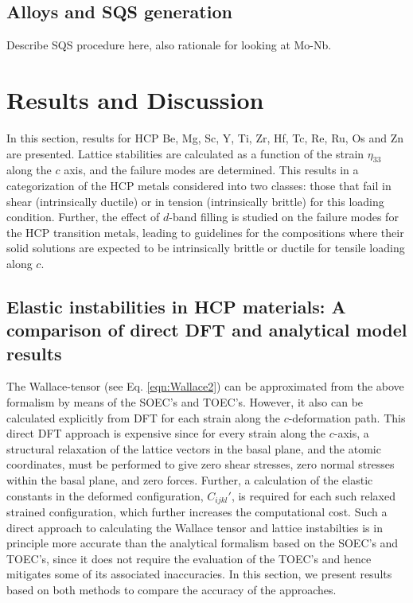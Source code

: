 \documentclass[showpacs,aps,floatfix,prb,reprint,superscriptaddress]{revtex4-1}
\begin{document}
\subsection{Alloys and SQS generation}
Describe SQS procedure here, also rationale for looking at Mo-Nb.

\section{Results and Discussion}
In this section, results for HCP Be, Mg, Sc, Y, Ti, Zr, Hf, Tc, Re, Ru, Os and Zn are presented. Lattice stabilities are calculated as a function of the strain $\eta_{33}$ along the $c$ axis, and the failure modes are determined. This results in a categorization of the HCP metals considered into two classes: those that fail in shear (intrinsically ductile) or in tension (intrinsically brittle) for this loading condition. Further, the effect of $d$-band filling is studied on the failure modes for the HCP transition metals, leading to guidelines for the compositions where their solid solutions are expected to be intrinsically brittle or ductile for tensile loading along $c$.

\subsection{Elastic instabilities in HCP materials: A comparison of direct DFT and analytical model results}
The Wallace-tensor (see Eq. \ref{eqn:Wallace2}) can be approximated from the above formalism by means of the SOEC's and TOEC's. However, it also can be calculated explicitly from DFT for each strain along the $c$-deformation path. This direct DFT approach is expensive since for every strain along the $c$-axis, a structural relaxation of the lattice vectors in the basal plane, and the atomic coordinates, must be performed to give zero shear stresses, zero normal stresses within the basal plane, and zero forces. Further, a calculation of the elastic constants in the deformed configuration, $C_{ijkl}'$, is required for each such relaxed strained configuration, which further increases the computational cost.  Such a direct approach to calculating the Wallace tensor and lattice instabilties is in principle more accurate than the analytical formalism based on the SOEC's and TOEC's, since it does not require the evaluation of the TOEC's and hence mitigates some of its associated inaccuracies. In this section, we present results based on both methods to compare the accuracy of the approaches.
\end{document}
